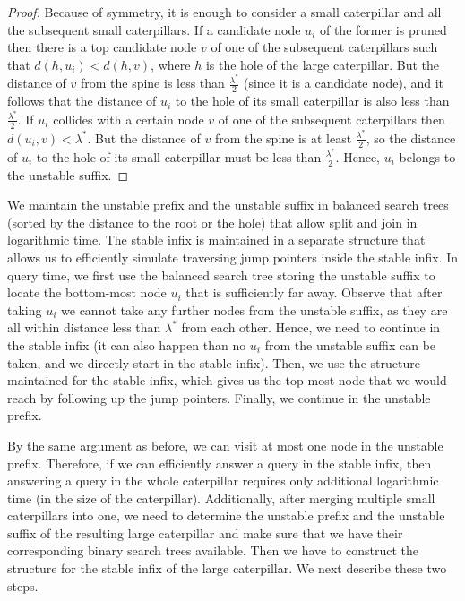 \documentclass[a4paper,UKenglish]{lipics-v2016}
\theoremstyle{plain}
\begin{document}
\begin{proof}
Because of symmetry, it is enough to consider a small caterpillar and all the subsequent
small caterpillars. If a candidate node $u_{i}$ of the former is pruned then there is a top candidate node
$v$ of one of the subsequent caterpillars such that $d(h,u_{i}) < d(h,v)$, where $h$ is the hole
of the large caterpillar. But the distance of $v$ from the spine is less than $\frac{\lambda^{*}}{2}$ (since it is a candidate node),
 and it follows that the distance of $u_{i}$ to the hole of its small caterpillar is also less
than $\frac{\lambda^{*}}{2}$. If $u_{i}$ collides with a certain node $v$ of one of the subsequent
caterpillars then $d(u_{i},v)<\lambda^{*}$. But the distance of $v$ from the spine is at least
$\frac{\lambda^{*}}{2}$, so the distance of $u_{i}$ to the hole of its small caterpillar must be
less than $\frac{\lambda^{*}}{2}$. Hence, $u_{i}$ belongs to the unstable suffix.
\end{proof}

We maintain the unstable prefix and the unstable suffix  in balanced search
trees (sorted by the distance to the root or the hole) that allow split and join in logarithmic time.
The stable infix is maintained in a separate structure that allows us to efficiently simulate traversing jump pointers inside the stable infix. 
%
In query time, we first use the balanced search tree storing the unstable suffix to locate the bottom-most node
$u_{i}$ that is sufficiently far away. Observe that after taking $u_{i}$ we cannot
take any further nodes from the unstable suffix, as they are all within distance less than
$\lambda^{*}$ from each other. Hence, we need to continue in the stable infix (it can also
happen than no $u_{i}$ from the unstable suffix can be taken, and we directly start in the stable
infix). Then, we use the structure maintained for the stable infix, which gives us the top-most
node that we would reach by following up the jump pointers. Finally, we  continue in the unstable prefix. 

By the same argument as before, we can visit at most one node in the unstable prefix.
Therefore, if we can efficiently answer a query in the stable infix, then answering a query in
the whole caterpillar requires only additional logarithmic time (in the size of the caterpillar).
Additionally, after merging multiple small caterpillars into one, we need to determine the unstable
prefix and the unstable suffix of the resulting large caterpillar and make sure that we have
their corresponding binary search trees available.
Then we have to construct the structure for the stable infix of the large caterpillar.
We next describe these two steps.
\end{document}
